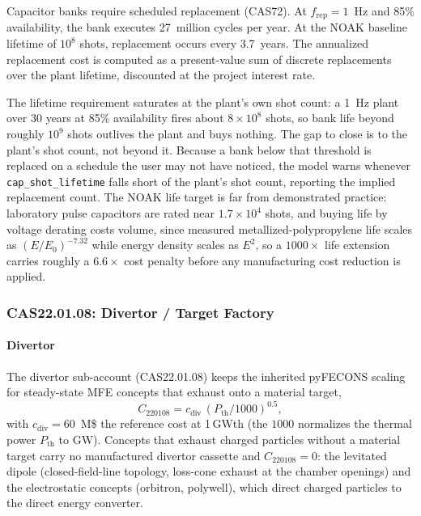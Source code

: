 \documentclass{article}
\begin{document}
Capacitor banks require scheduled replacement (CAS72). At $f_{\text{rep}}
= 1$~Hz and 85\% availability, the bank executes 27~million cycles per
year. At the NOAK baseline lifetime of $10^8$ shots, replacement occurs
every 3.7~years. The annualized replacement cost is computed as a
present-value sum of discrete replacements over the plant lifetime,
discounted at the project interest rate.

The lifetime requirement saturates at the plant's own shot count: a
1~Hz plant over 30 years at 85\% availability fires about $8\times10^8$
shots, so bank life beyond roughly $10^9$ shots outlives the plant and
buys nothing. The gap to close is to the plant's shot count, not
beyond it. Because a bank below that threshold is replaced on a
schedule the user may not have noticed, the model warns whenever
\texttt{cap\_shot\_lifetime} falls short of the plant's shot count,
reporting the implied replacement count. The NOAK life target is far
from demonstrated practice: laboratory pulse capacitors are rated near
$1.7\times10^4$ shots, and buying life by voltage derating costs
volume, since measured metallized-polypropylene life scales as
$(E/E_0)^{-7.32}$ while energy density scales as $E^2$, so a
$1000\times$ life extension carries roughly a $6.6\times$ cost penalty
before any manufacturing cost reduction is applied.

\subsubsection{CAS22.01.08: Divertor / Target Factory}
\label{sec:cas2208}

\paragraph{Divertor}
The divertor sub-account (CAS22.01.08) keeps the inherited pyFECONS scaling
for steady-state MFE concepts that exhaust onto a material target,
\begin{equation}
\label{eq:cas2208-div}
C_{220108} = c_{\text{div}}\,(P_{\text{th}}/1000)^{0.5},
\end{equation}
with $c_{\text{div}} = 60$~M\$ the reference cost at 1\,GWth (the $1000$
normalizes the thermal power $P_{\text{th}}$ to GW). Concepts
that exhaust charged particles without a material target carry no
manufactured divertor cassette and $C_{220108} = 0$: the levitated
dipole (closed-field-line topology, loss-cone exhaust at the chamber
openings) and the electrostatic concepts (orbitron, polywell), which
direct charged particles to the direct energy converter.
\end{document}
